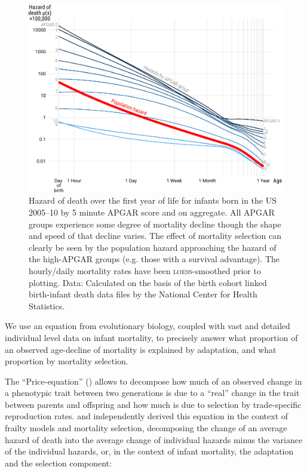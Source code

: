 \documentclass[12pt, parskip=half]{scrartcl}
\begin{document}
\begin{figure}[!htb]
  \centering
  \includegraphics[width = \textwidth]{./fig/plot_ilt_dob0510_apgar5.pdf}
  \caption{Hazard of death over the first year of life for infants born in the US 2005--10 by 5 minute APGAR score and on aggregate. All APGAR groups experience some degree of mortality decline though the shape and speed of that decline varies. The effect of mortality selection can clearly be seen by the population hazard approaching the hazard of the high-APGAR groups (e.g. those with a survival advantage). The hourly/daily mortality rates have been \textsc{loess}-smoothed prior to plotting. Data: Calculated on the basis of the birth cohort linked birth-infant death data files by the National Center for Health Statistics.}
  \label{fig:apgar}
\end{figure}

We use an equation from evolutionary biology, coupled with vast and detailed individual level data on infant mortality, to precisely answer what proportion of an observed age-decline of mortality is explained by adaptation, and what proportion by mortality selection.

The \enquote{Price-equation} (\cite{Price1970}) allows to decompose how much of an observed change in a phenotypic trait between two generations is due to a \enquote{real} change in the trait between parents and offspring and how much is due to selection by trade-specific reproduction rates. \cite{Vaupel2002} and \cite{Vaupel2010a} independently derived this equation in the context of frailty models and mortality selection, decomposing the change of an average hazard of death into the average change of individual hazards minus the variance of the individual hazards, or, in the context of infant mortality, the adaptation and the selection component:
\end{document}
